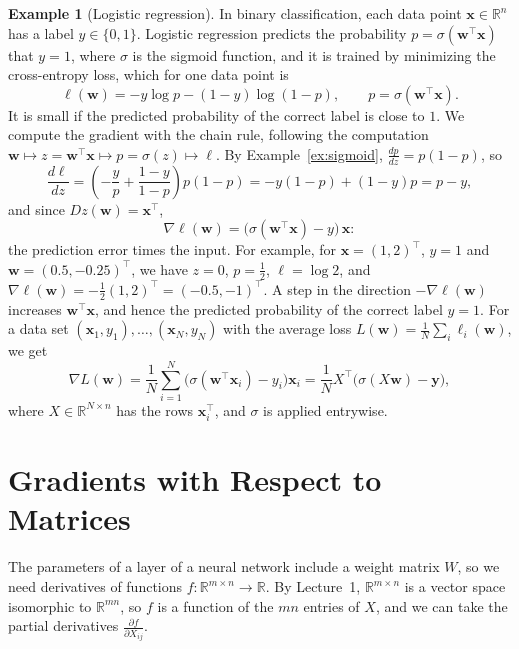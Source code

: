 \documentclass[11pt]{article}
\theoremstyle{definition}
\newtheorem{example}[definition]{Example}
\theoremstyle{plain}
\theoremstyle{remark}
\begin{document}
\begin{example}[Logistic regression]\label{ex:logistic}
    In binary classification, each data point $\mathbf{x} \in \mathbb{R}^n$ has a label $y \in \{0, 1\}$. Logistic regression predicts the probability $p = \sigma(\mathbf{w}^\top \mathbf{x})$ that $y = 1$, where $\sigma$ is the sigmoid function, and it is trained by minimizing the cross-entropy loss, which for one data point is
    \[\ell(\mathbf{w}) = -y \log p - (1 - y) \log(1 - p), \qquad p = \sigma(\mathbf{w}^\top \mathbf{x}).\]
    It is small if the predicted probability of the correct label is close to $1$. We compute the gradient with the chain rule, following the computation $\mathbf{w} \mapsto z = \mathbf{w}^\top \mathbf{x} \mapsto p = \sigma(z) \mapsto \ell$. By Example~\ref{ex:sigmoid}, $\frac{dp}{dz} = p(1 - p)$, so
    \[\frac{d\ell}{dz} = \left(-\frac{y}{p} + \frac{1 - y}{1 - p}\right) p(1 - p) = -y(1 - p) + (1 - y)p = p - y,\]
    and since $Dz(\mathbf{w}) = \mathbf{x}^\top$,
    \[\nabla \ell(\mathbf{w}) = \big(\sigma(\mathbf{w}^\top\mathbf{x}) - y\big) \, \mathbf{x}:\]
    the prediction error times the input. For example, for $\mathbf{x} = (1, 2)^\top$, $y = 1$ and $\mathbf{w} = (0.5, -0.25)^\top$, we have $z = 0$, $p = \frac{1}{2}$, $\ell = \log 2$, and $\nabla \ell(\mathbf{w}) = -\frac{1}{2}(1, 2)^\top = (-0.5, -1)^\top$. A step in the direction $-\nabla\ell(\mathbf{w})$ increases $\mathbf{w}^\top\mathbf{x}$, and hence the predicted probability of the correct label $y = 1$. For a data set $(\mathbf{x}_1, y_1), \ldots, (\mathbf{x}_N, y_N)$ with the average loss $L(\mathbf{w}) = \frac{1}{N}\sum_i \ell_i(\mathbf{w})$, we get
    \[\nabla L(\mathbf{w}) = \frac{1}{N} \sum_{i=1}^N \big(\sigma(\mathbf{w}^\top\mathbf{x}_i) - y_i\big) \mathbf{x}_i = \frac{1}{N} X^\top \big(\sigma(X\mathbf{w}) - \mathbf{y}\big),\]
    where $X \in \mathbb{R}^{N \times n}$ has the rows $\mathbf{x}_i^\top$, and $\sigma$ is applied entrywise.
\end{example}

\section{Gradients with Respect to Matrices}\label{sec:matrix-gradients}

The parameters of a layer of a neural network include a weight matrix $W$, so we need derivatives of functions $f: \mathbb{R}^{m \times n} \to \mathbb{R}$. By Lecture~1, $\mathbb{R}^{m \times n}$ is a vector space isomorphic to $\mathbb{R}^{mn}$, so $f$ is a function of the $mn$ entries of $X$, and we can take the partial derivatives $\frac{\partial f}{\partial X_{ij}}$.
\end{document}
